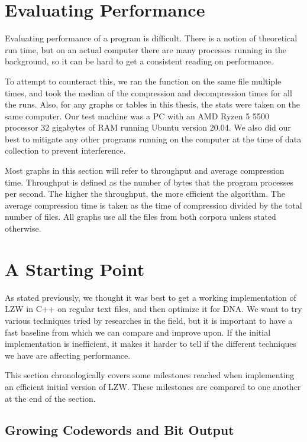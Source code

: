 \documentclass[12pt,twoside]{reedthesis}
\begin{document}
\hypertarget{evaluating-performance}{%
\section{Evaluating Performance}\label{evaluating-performance}}

Evaluating performance of a program is difficult. There is a notion of theoretical run time, but on an actual computer there are many processes running in the background, so it can be hard to get a consistent reading on performance.

To attempt to counteract this, we ran the function on the same file multiple times, and took the median of the compression and decompression times for all the runs. Also, for any graphs or tables in this thesis, the stats were taken on the same computer. Our test machine was a PC with an AMD Ryzen 5 5500 processor 32 gigabytes of RAM running Ubuntu version 20.04. We also did our best to mitigate any other programs running on the computer at the time of data collection to prevent interference.

Most graphs in this section will refer to throughput and average compression time. Throughput is defined as the number of bytes that the program processes per second. The higher the throughput, the more efficient the algorithm. The average compression time is taken as the time of compression divided by the total number of files. All graphs use all the files from both corpora unless stated otherwise.

\hypertarget{a-starting-point}{%
\section{A Starting Point}\label{a-starting-point}}

As stated previously, we thought it was best to get a working implementation of LZW in C++ on regular text files, and then optimize it for DNA. We want to try various techniques tried by researches in the field, but it is important to have a fast baseline from which we can compare and improve upon. If the initial implementation is inefficient, it makes it harder to tell if the different techniques we have are affecting performance.

This section chronologically covers some milestones reached when implementing an efficient initial version of LZW. These milestones are compared to one another at the end of the section.

\hypertarget{growing-codewords-and-bit-output}{%
\subsection{Growing Codewords and Bit Output}\label{growing-codewords-and-bit-output}}
\end{document}
